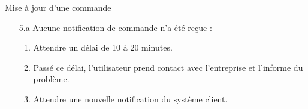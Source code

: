 \begin{UseCase}{Mise à jour d'une commande}
\begin{UseCaseExtension}
\begin{enumerate}
\begin{enumerate}
                \item Le système client notifie l'utilisateur de l'anomalie si
                    le nombre de signaux émis par la balance est supérieur à
                    \textit{10}.
                \item L'utilisateur modifie manuellement la commande.
                \item La commande est mise à jour.
                \item Le scénario continue à l'étape 5.
            \end{enumerate}
        \item[5.a] Aucune notification de commande n'a été reçue :
            \begin{enumerate}
                \item Attendre un délai de 10 à 20 minutes.
                \item Passé ce délai, l'utilisateur prend contact avec
                    l'entreprise et l'informe du problème.
                \item Attendre une nouvelle notification du système client.
            \end{enumerate}
    \end{enumerate}
\end{UseCaseExtension}

\end{UseCase}
